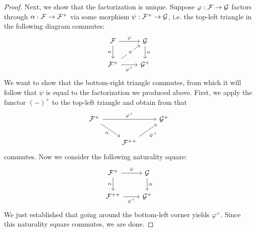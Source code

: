 \begin{proof}
    Next, we show that the factorization is unique. Suppose $\varphi : \cal{F} \to \cal{G}$ factors through $\alpha : \cal{F} \to \cal{F}^+$ via some morphism $\psi : \cal{F}^+ \to \cal{G}$, i.e. the top-left triangle in the following diagram commutes:
    \[\begin{tikzcd}[ampersand replacement=\&]
            {\cal{F}} \& {\cal{G}} \\
            {\cal{F}^+} \& {\cal{G}^+}
            \arrow["\varphi", from=1-1, to=1-2]
            \arrow["\alpha"', from=1-1, to=2-1]
            \arrow["\alpha", from=1-2, to=2-2]
            \arrow["\psi"{description}, from=2-1, to=1-2]
            \arrow["{\varphi^+}"', from=2-1, to=2-2]
        \end{tikzcd}\]
    We want to show that the bottom-right triangle commutes, from which it will follow that $\psi$ is equal to the factorization we produced above. First, we apply the functor ${(-)}^+$ to the top-left triangle and obtain from  that
    \[\begin{tikzcd}[ampersand replacement=\&]
            {\cal{F}^+} \&\& {\cal{G}^+} \\
            \& {\cal{F}^{++}}
            \arrow["{\varphi^+}", from=1-1, to=1-3]
            \arrow["\alpha"', from=1-1, to=2-2]
            \arrow["{\psi^+}"', from=2-2, to=1-3]
        \end{tikzcd}\]
    commutes. Now we consider the following naturality square:
    \[\begin{tikzcd}[ampersand replacement=\&]
            {\cal{F}^+} \& {\cal{G}} \\
            {\cal{F}^{++}} \& {\cal{G}^+}
            \arrow["\psi", from=1-1, to=1-2]
            \arrow["\alpha"', from=1-1, to=2-1]
            \arrow["\alpha", from=1-2, to=2-2]
            \arrow["{\psi^+}"', from=2-1, to=2-2]
        \end{tikzcd}\]
    We just established that going around the bottom-left corner yields $\varphi^+$. Since this naturality square commutes, we are done.
\end{proof}

